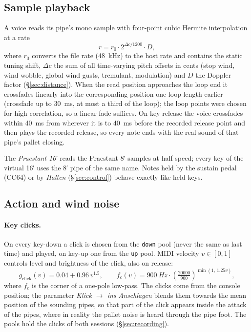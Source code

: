 \documentclass[11pt,a4paper,parskip=half,DIV=11,toc=bibliography]{scrartcl}
\newcommand{\ui}[1]{\emph{#1}}                 %
\newcommand{\code}[1]{\texttt{#1}}
\begin{document}
\subsection{Sample playback}
A voice reads its pipe's mono sample with four-point cubic Hermite interpolation at a rate
\begin{equation}
  r = r_0 \cdot 2^{\Delta c/1200}\cdot D,
\end{equation}
where $r_0$ converts the file rate (\SI{48}{kHz}) to the host rate and contains the static tuning shift,
$\Delta c$ the sum of all time-varying pitch offsets in cents (stop wind, wind wobble, global wind
gusts, tremulant, modulation) and $D$ the Doppler factor (\S\ref{sec:distance}). When the read
position approaches the loop end it crossfades linearly into the corresponding position one loop length earlier
(crossfade up to \SI{30}{ms}, at most a third of the loop); the loop points were chosen for high correlation,
so a linear fade suffices. On key release the voice crossfades within \SI{40}{ms} from
wherever it is to \SI{40}{ms} before the recorded release point and then plays the recorded release,
so every note ends with the real sound of that pipe's pallet closing.

The \emph{Praestant 16′} reads the Praestant 8′ samples at half speed; every key of the virtual
16′ uses the 8′ pipe of the same name. Notes held by the sustain pedal (CC64) or by \ui{Halten}
(\S\ref{sec:control}) behave exactly like held keys.

\subsection{Action and wind noise}
\paragraph{Key clicks.} On every key-down a click is chosen from the \code{down} pool (never the same as
last time) and played, on key-up one from the \code{up} pool. MIDI velocity $v\in[0,1]$ controls level
and brightness of the click, also on release:
\begin{equation}
  g_\text{click}(v) = 0.04 + 0.96\,v^{1.5},\qquad
  f_c(v) = \SI{900}{Hz}\cdot\left(\tfrac{20000}{900}\right)^{\min(1,\,1.25 v)} ,
\end{equation}
where $f_c$ is the corner of a one-pole low-pass. The clicks come from the console position; the
parameter \ui{Klick $\rightarrow$ ins Anschlagen} blends them towards the mean position of the
sounding pipes, so that part of the click appears inside the attack of the pipes, where in reality
the pallet noise is heard through the pipe foot. The pools hold the clicks of both sessions (\S\ref{sec:recording}).
\end{document}
